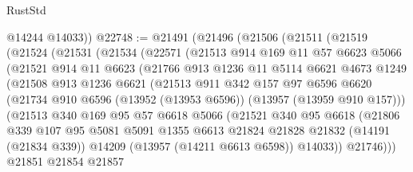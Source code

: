 \begin{lexlean}{RustStd}
\begin{coremodule}
        @14244
        @14033))
@22748 := @21491
    (@21496
      (@21506
        (@21511
          (@21519
            (@21524
              (@21531
                (@21534
                  (@22571
                    (@21513
                      @914
                      @169
                      @11
                      @57
                      @6623
                      @5066
                      (@21521
                        @914
                        @11
                        @6623
                        (@21766
                          @913
                          @1236
                          @11
                          @5114
                          @6621
                          @4673
                          @1249
                          (@21508
                            @913
                            @1236
                            @6621
                            (@21513
                              @911
                              @342
                              @157
                              @97
                              @6596
                              @6620
                              (@21734
                                @910
                                @6596
                                (@13952 (@13953 @6596))
                                (@13957 (@13959 @910 @157)))
                              (@21513
                                @340
                                @169
                                @95
                                @57
                                @6618
                                @5066
                                (@21521
                                  @340
                                  @95
                                  @6618
                                  (@21806
                                    @339
                                    @107
                                    @95
                                    @5081
                                    @5091
                                    @1355
                                    @6613
                                    @21824
                                    @21828
                                    @21832
                                    (@14191 (@21834 @339))
                                    @14209
                                    (@13957 (@14211 @6613 @6598))
                                    @14033))
                                @21746)))
                          @21851
                          @21854
                          @21857

\end{coremodule}
\end{lexlean}
